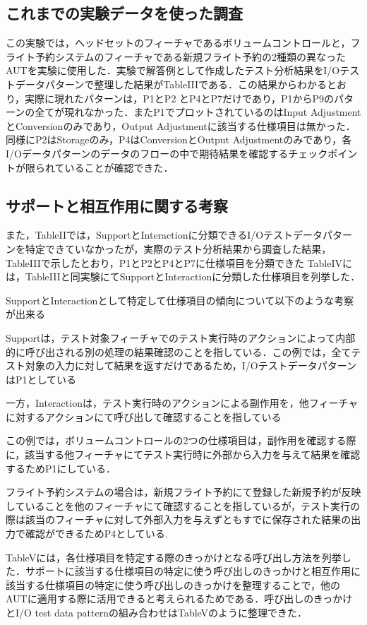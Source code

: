 \documentclass[a4paper,12pt]{jreport}
\begin{document}
\subsection{これまでの実験データを使った調査}
この実験では，ヘッドセットのフィーチャであるボリュームコントロールと，フライト予約システムのフィーチャである新規フライト予約の2種類の異なったAUTを実験に使用した．実験で解答例として作成したテスト分析結果をI/Oテストデータパターンで整理した結果がTableIIIである．この結果からわかるとおり，実際に現れたパターンは，P1とP2 とP4とP7だけであり，P1からP9のパターンの全てが現れなかった．またP1でプロットされているのはInput AdjustmentとConversionのみであり，Output Adjustmentに該当する仕様項目は無かった．同様にP2はStorageのみ，P4はConversionとOutput Adjustmentのみであり，各I/Oデータパターンのデータのフローの中で期待結果を確認するチェックポイントが限られていることが確認できた．

\subsection{サポートと相互作用に関する考察}
また，TableIIでは，SupportとInteractionに分類できるI/Oテストデータパターンを特定できていなかったが，実際のテスト分析結果から調査した結果，
TableIIIで示したとおり，P1とP2とP4とP7に仕様項目を分類できた
TableIVには，TableIIIと同実験にてSupportとInteractionに分類した仕様項目を列挙した．

SupportとInteractionとして特定して仕様項目の傾向について以下のような考察が出来る

Supportは，テスト対象フィーチャでのテスト実行時のアクションによって内部的に呼び出される別の処理の結果確認のことを指している．この例では，全てテスト対象の入力に対して結果を返すだけであるため，I/OテストデータパターンはP1としている


一方，Interactionは，テスト実行時のアクションによる副作用を，他フィーチャに対するアクションにて呼び出して確認することを指している

この例では，ボリュームコントロールの2つの仕様項目は，副作用を確認する際に，該当する他フィーチャにてテスト実行時に外部から入力を与えて結果を確認するためP1にしている．

フライト予約システムの場合は，新規フライト予約にて登録した新規予約が反映していることを他のフィーチャにて確認することを指しているが，テスト実行の際は該当のフィーチャに対して外部入力を与えずともすでに保存された結果の出力で確認ができるためP4としている.

TableVには，各仕様項目を特定する際のきっかけとなる呼び出し方法を列挙した．サポートに該当する仕様項目の特定に使う呼び出しのきっかけと相互作用に該当する仕様項目の特定に使う呼び出しのきっかけを整理することで，他のAUTに適用する際に活用できると考えられるためである．呼び出しのきっかけとI/O test data patternの組み合わせはTableVのように整理できた．
\end{document}
